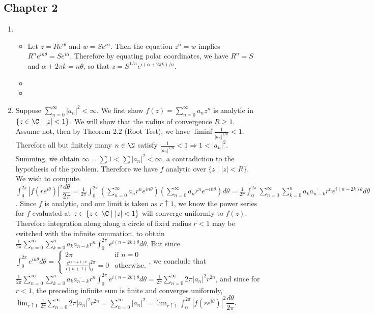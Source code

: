 \documentclass[11pt]{book}
\theoremstyle{definition}
\begin{document}
\subsection{Chapter 2}
\begin{enumerate}
%
%
\item
\begin{itemize}
\item Let $z=Re^{i\theta}$ and $w=Se^{i\alpha}$. Then the equation $z^n=w$ implies $R^ne^{in\theta}=Se^{i\alpha}$. Therefore by equating polar coordinates, we have $R^n=S$ and $\alpha +2\pi k= n\theta$, so that $z=S^{1/n}e^{i(\alpha+2\pi k)/n}$.
\item 
\item
\end{itemize}
%
%
\item Suppose $\sum_{n=0}^\infty |a_n|^2 < \infty$. We first show $f(z)=\sum_{n=0}^\infty a_nz^n$ is analytic in $\{z\in\C\mid |z|<1\}$. We will show that the radius of convergence $R\geq 1$. Assume not, then by Theorem 2.2 (Root Test), we have $\liminf \frac{1}{|a_n|^{1/n}}<1$. Therefore all but finitely many $n\in \N$ satisfy $\frac{1}{|a_n|^{1/n}} < 1\Rightarrow 1 < |a_n|^2$. Summing, we obtain $\infty = \sum 1 < \sum |a_n|^2 < \infty$, a contradiction to the hypothesis of the problem. Therefore we have $f$ analytic over $\{z\mid |z|<R\}$. We wish to compute $\int_0^{2\pi} |f(re^{i\theta})|^2\dfrac{d\theta}{2\pi} = \frac{1}{2\pi} \int_0^{2\pi} \left(\sum_{n=0}^\infty a_nr^ne^{in\theta}\right)\left(\sum_{n=0}^\infty \overline{a_n}r^ne^{-in\theta}\right)d\theta = \frac{1}{2\pi}\int_0^{2\pi} \sum_{n=0}^\infty\sum_{k=0}^n a_k\overline{a_{n-k}}r^ne^{i(n-2k)\theta}d\theta$. Since $f$ is analytic, and our limit is taken as $r\uparrow1$, we know the power series for $f$ evaluated at $z\in \{z\in\C\mid |z|<1\}$ will converge uniformly to $f(z)$. Therefore integration along along a circle of fixed radius $r<1$ may be switched with the infinite summation, to obtain $\frac{1}{2\pi}\sum_{n=0}^\infty \sum_{k=0}^na_k\overline{a_{n-k}}r^n\int_0^{2\pi}e^{i(n-2k)\theta}d\theta$. But since $\int_0^{2\pi} e^{in\theta}d\theta = \begin{cases} 2\pi &\mbox{if } n=0 \\ \frac{e^{i(n+1)\theta}}{i(n+1)}\bigg|_0^{2\pi}=0 & \mbox{otherwise.} \end{cases}$, we conclude that $\frac{1}{2\pi}\sum_{n=0}^\infty \sum_{k=0}^na_k\overline{a_{n-k}}r^n\int_0^{2\pi}e^{i(n-2k)\theta}d\theta = \frac{1}{2\pi} \sum_{n=0}^\infty 2\pi |a_n|^2 r^{2n}$, and since for $r<1$, the preceding infinite sum is finite and converges uniformly, $\lim_{r\uparrow 1}\frac{1}{2\pi} \sum_{n=0}^\infty 2\pi |a_n|^2 r^{2n}= \sum_{n=0}^\infty |a_n|^2 = \lim_{r\uparrow1}\int_0^{2\pi} |f(re^{i\theta})|^2\dfrac{d\theta}{2\pi}$.

\end{enumerate}
\end{document}
